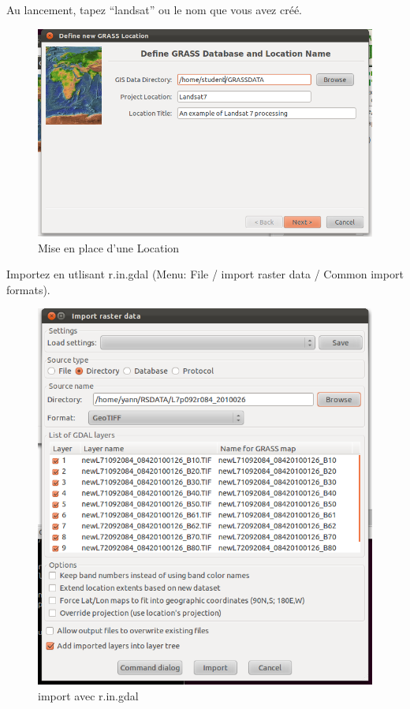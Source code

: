 Au lancement, tapez ``landsat'' ou le nom que vous avez cr\'e\'e.

\begin{figure}[htbp]
   \centering
   \includegraphics[scale=0.35]{grass_rs001.png}
   \caption{Mise en place d'une Location}
   \label{fig:grass_rs001}
\end{figure}

Importez en utlisant r.in.gdal (Menu: File / import raster data / Common import formats).

\begin{figure}[htbp]
   \centering
   \includegraphics[scale=0.35]{grass_rs002.png}
   \caption{import avec r.in.gdal}
   \label{fig:grass_rs002}
\end{figure}

